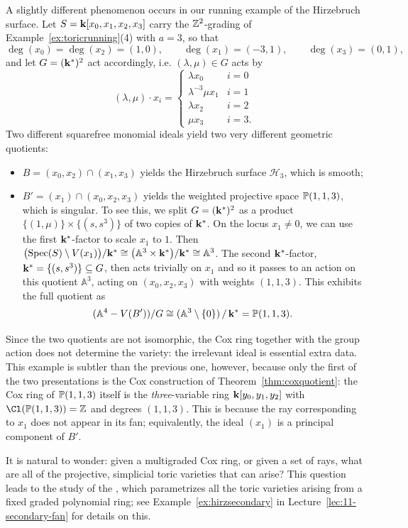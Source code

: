\documentclass{amsart}
\begin{document}
\begin{example}\label{ex:sameCox}
  A slightly different phenomenon occurs in our running example of the Hirzebruch surface.  Let $S={\bf k}[x_0,x_1,x_2,x_3]$ carry the $\mathbb Z^2$-grading of Example~\ref{ex:toricrunning}(4) with $a=3$, so that
  \[ \deg(x_0)=\deg(x_2)=(1,0),\qquad \deg(x_1)=(-3,1),\qquad \deg(x_3)=(0,1), \]
  and let $G = ({\bf k}^*)^2$ act accordingly, i.e. $(\lambda, \mu) \in G$ acts by
  \[
  (\lambda, \mu)\cdot x_i = \begin{cases}
\lambda x_0 & i = 0\\
\lambda^{-3}\mu x_1 & i = 1\\
\lambda x_2 & i = 2\\
\mu x_3 & i = 3.
  \end{cases}
  \]
  Two different squarefree monomial ideals yield two very different geometric quotients:
  \begin{itemize}
  \item $B = (x_0,x_2) \cap (x_1,x_3)$ yields the Hirzebruch surface $\mathcal H_3$, which is smooth;
  \item $B'= (x_1) \cap (x_0,x_2,x_3)$ yields the weighted projective space $\mathbb P(1,1,3)$, which is singular.  To see this, we split $G = ({\bf k}^*)^2$ as a product $\{(1,\mu)\}\times\{(s,s^3)\}$ of two copies of ${\bf k}^*$. On the locus $x_1 \neq 0$, we can use the first ${\bf k}^*$-factor to scale $x_1$ to $1$.  Then $\bigl(\operatorname{Spec}(S) \setminus V(x_1)\bigr) / {\bf k}^* \cong \bigl(\mathbb A^3 \times {\bf k}^*\bigr) / {\bf k}^* \cong \mathbb A^3$.  The second ${\bf k}^*$-factor, ${\bf k}^* = \{(s, s^3)\} \subseteq G$, then acts trivially on $x_1$ and so it passes to an action on this quotient $\mathbb A^3$, acting on $(x_0,x_2,x_3)$ with weights $(1,1,3)$.  This exhibits the full quotient as
  \[
  (\mathbb A^4 - V(B')) / G \cong (\mathbb A^3\setminus\{0\})\,/\,{\bf k}^* = \mathbb P(1,1,3).
  \]
  \end{itemize}

  Since the two quotients are not isomorphic, the Cox ring together with the group action does not determine the variety: the irrelevant ideal is essential extra data.  This example is subtler than the previous one, however, because only the first of the two presentations is the Cox construction of Theorem~\ref{thm:coxquotient}:
  the Cox ring of $\mathbb P(1,1,3)$ itself is the \emph{three}-variable ring ${\bf k}[y_0,y_1,y_2]$ with $\Cl(\PP(1,1,3))=\ZZ$ and degrees $(1,1,3)$.  This is because the ray corresponding to $x_1$ does not appear in its fan; equivalently, the ideal $(x_1)$ is a principal component of $B'$.
\end{example}
It is natural to wonder: given a multigraded Cox ring, or given a set of rays, what are all of the projective, simplicial toric varieties that can arise?  This question leads to the study of the , which parametrizes all the toric varieties arising from a fixed graded polynomial ring; see Example~\ref{ex:hirzsecondary} in Lecture~\ref{lec:11-secondary-fan} for details on this.
\end{document}
